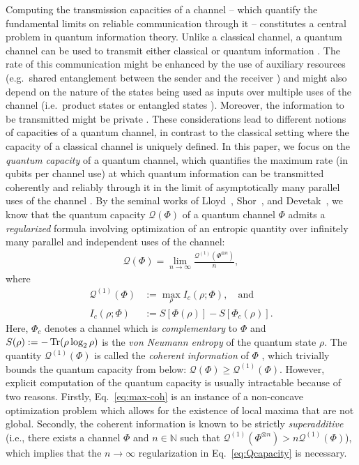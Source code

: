 \documentclass[a4paper,onecolumn,10pt,accepted=2022-07-11]{quantumarticle}
\theoremstyle{definition}
\begin{document}
Computing the transmission capacities of a channel -- which quantify the fundamental limits on reliable communication through it -- constitutes a central problem in quantum information theory. Unlike a classical channel, a quantum channel can be used to transmit either classical \cite{Schumacher1997classical,Holevo1998classical} or quantum information \cite{Lloyd1997capacity,Divince1998capacity}. The rate of this communication might be enhanced by the use of auxiliary resources (e.g.~shared entanglement between the sender and the receiver \cite{Bennett1996entcap,Bennett1999entcap}) and might also depend on the nature of the states being used as inputs over multiple uses of the channel (i.e.~product states or entangled states \cite{Divince1998capacity}). Moreover, the information to be transmitted might be private \cite{Cai2004private, Devetak2005capacity}. These considerations lead to different notions of capacities of a quantum channel, in contrast to the classical setting where the capacity of a classical channel is uniquely defined. In this paper, we focus on the {\em{quantum capacity}} of a quantum channel, which quantifies the maximum rate (in qubits per channel use) at which quantum information can be transmitted coherently and reliably through it in the limit of asymptotically many parallel uses of the channel \cite[Chapter 24]{Wilde2009book}. By the seminal works of Lloyd~\cite{Lloyd1997capacity}, Shor~\cite{Shor2007capacity}, and Devetak~\cite{Devetak2005capacity}, we know that the quantum capacity $\mathcal{Q}(\Phi)$ of a quantum channel $\Phi$ admits a {\em{regularized}} formula involving optimization of an entropic quantity over infinitely many parallel and independent uses of the channel:
\begin{align}\label{eq:Qcapacity}
    \mathcal{Q}(\Phi) = \lim_{n \to \infty} \frac{\mathcal{Q}^{(1)}(\Phi^{\otimes n})}{n},
    \end{align}
    where
    \begin{align}
    \mathcal{Q}^{(1)}(\Phi) &:= \max_\rho I_c(\rho;\Phi), \quad\text{and} \label{eq:max-coh} \\
    I_c(\rho;\Phi) &:=  S[\Phi(\rho)]- S[\Phi_c(\rho)]. \label{eq:coherent}
\end{align}
Here, $\Phi_c$ denotes a channel which is \emph{complementary} to $\Phi$ and $S(\rho):= -\Tr (\rho \log_2 \rho)$ is the \emph{von Neumann entropy} of the quantum state $\rho$. The quantity $ \mathcal{Q}^{(1)}(\Phi)$ is called the {\em{coherent information}} of $\Phi$ \cite{Barnum1998coherent}, which trivially bounds the quantum capacity from below: $\mathcal{Q}(\Phi)\geq \mathcal{Q}^{(1)}(\Phi)$. However, explicit computation of the quantum capacity is usually intractable because of two reasons. Firstly, Eq.~\eqref{eq:max-coh} is an instance of a non-concave optimization problem which allows for the existence of local maxima that are not global. Secondly, the coherent information is known to be strictly \emph{superadditive} \cite{Divince1998capacity,Leditzky2018super} (i.e., there exists a channel $\Phi$ and $n\in\mathbb{N}$ such that $ \mathcal{Q}^{(1)}(\Phi^{\otimes n}) > n\mathcal{Q}^{(1)}(\Phi)$), which implies that the $n\rightarrow \infty$ regularization in Eq.~\eqref{eq:Qcapacity} is necessary.
 
\end{document}
